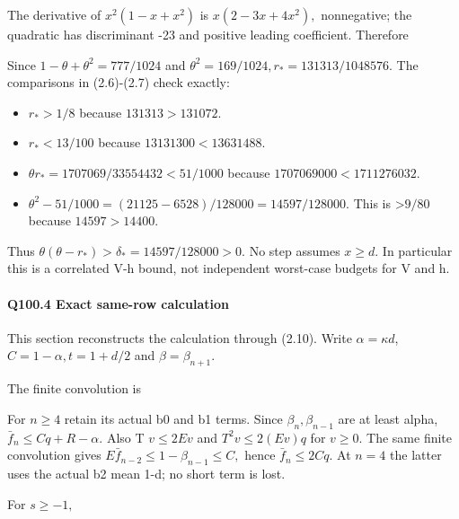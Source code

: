 The derivative of \(x^2(1-x+x^2)\) is \(x(2-3x+4x^2),\allowbreak \) nonnegative;
the quadratic has discriminant -23 and positive leading coefficient.
Therefore


Since \(1-\theta+\theta^2=777/1024\) and \(\theta^2=169/1024,\allowbreak  r_*=131313/1048576.\) The comparisons in (2.6)-(2.7) check exactly:

\begin{itemize}
\item \(r_*>1/8\) because \(131313>131072.\)
\item \(r_*<13/100\) because \(13131300<13631488.\)
\item \(\theta r_*=1707069/33554432<51/1000\) because
  \(1707069000<1711276032.\)
\item \(\theta^2-51/1000=(21125-6528)/128000=14597/128000.\)
  This is >\(9/80\) because \(14597>14400.\)
\end{itemize}

Thus \(\theta(\theta-r_*)>\delta_*=14597/128000>0.\) No step assumes \(x\ge d.\)
In particular this is a correlated V-h bound, not independent worst-case
budgets for V and h.

\paragraph{Q100.4 Exact same-row calculation}

This section reconstructs the calculation through (2.10). Write \(\alpha=\kappa d\), \(C=1-\alpha,\allowbreak  t=1+d/2\) and \(\beta=\beta_{n+1}.\)

The finite convolution is


For \(n\ge 4\) retain its actual b0 and b1 terms. Since \(\beta_n,\allowbreak  \beta_{n-1}\)
are at least alpha, \(\bar f_n\le Cq+R-\alpha.\) Also T \(v\le 2Ev\) and
\(T^2v\le 2(Ev)q\) for \(v\ge 0.\) The same finite convolution gives
\(E\bar f_{n-2}\le 1-\beta_{n-1}\le C,\allowbreak \) hence \(\bar f_n\le 2Cq.\)
At \(n=4\) the latter uses the actual b2 mean 1-d; no short term is lost.

For \(s\ge -1,\allowbreak \)

